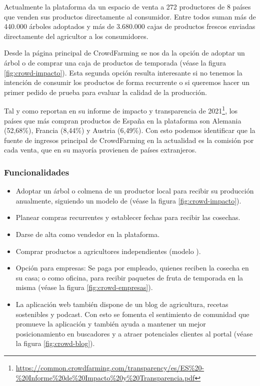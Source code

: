 Actualmente la plataforma da un espacio de venta a 272 productores de 8 países que venden sus productos directamente al consumidor. Entre todos suman más de 440.000 árboles adoptados y más de 3.680.000 cajas de productos frescos enviadas directamente del agricultor a los consumidores.

Desde la página principal de CrowdFarming se nos da la opción de adoptar un árbol o de comprar una caja de productos de temporada (véase la figura \ref{fig:crowd-impacto}). Esta segunda opción resulta interesante si no tenemos la intención de consumir los productos de forma recurrente o si queremos hacer un primer pedido de prueba para evaluar la calidad de la producción.


Tal y como reportan en su informe de impacto y transparencia de 2021\footnote{\url{https://common.crowdfarming.com/transparency/es/ES\%20-\%20Informe\%20de\%20Impacto\%20y\%20Transparencia.pdf}}, los países que más compran productos de España en la plataforma son Alemania (52,68\%), Francia (8,44\%) y Austria (6,49\%). Con esto podemos identificar que la fuente de ingresos principal de CrowdFarming en la actualidad es la comisión por cada venta, que en su mayoría provienen de países extranjeros.

\subsubsection{Funcionalidades}

\begin{itemize}

	\item Adoptar un árbol o colmena de un productor local para recibir su producción anualmente, siguiendo un modelo de  (véase la figura \ref{fig:crowd-impacto}).

	\item Planear compras recurrentes y establecer fechas para recibir las cosechas.

	\item Darse de alta como vendedor en la plataforma.

	\item Comprar productos a agricultores independientes (modelo ).

	\item Opción para empresas: Se paga por empleado, quienes reciben la cosecha en su casa; o como oficina, para recibir paquetes de fruta de temporada en la misma (véase la figura \ref{fig:crowd-empresas}).

	\item La aplicación web también dispone de un blog de agricultura, recetas sostenibles y podcast. Con esto se fomenta el sentimiento de comunidad que promueve la aplicación y también ayuda a mantener un mejor posicionamiento en buscadores y a atraer potenciales clientes al portal (véase la figura \ref{fig:crowd-blog}).

\end{itemize}

